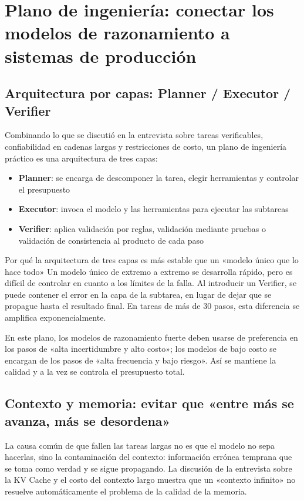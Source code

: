 \section{Plano de ingeniería: conectar los modelos de razonamiento a sistemas de producción}

\subsection{Arquitectura por capas: Planner / Executor / Verifier}

Combinando lo que se discutió en la entrevista sobre tareas verificables, confiabilidad en cadenas largas y restricciones de costo, un plano de ingeniería práctico es una arquitectura de tres capas:
\begin{itemize}
    \item \textbf{Planner}: se encarga de descomponer la tarea, elegir herramientas y controlar el presupuesto
    \item \textbf{Executor}: invoca el modelo y las herramientas para ejecutar las subtareas
    \item \textbf{Verifier}: aplica validación por reglas, validación mediante pruebas o validación de consistencia al producto de cada paso
\end{itemize}

\begin{knowledgebox}{Por qué la arquitectura de tres capas es más estable que un «modelo único que lo hace todo»}
Un modelo único de extremo a extremo se desarrolla rápido, pero es difícil de controlar en cuanto a los límites de la falla. Al introducir un Verifier, se puede contener el error en la capa de la subtarea, en lugar de dejar que se propague hasta el resultado final. En tareas de más de 30 pasos, esta diferencia se amplifica exponencialmente.
\end{knowledgebox}

En este plano, los modelos de razonamiento fuerte deben usarse de preferencia en los pasos de «alta incertidumbre y alto costo»; los modelos de bajo costo se encargan de los pasos de «alta frecuencia y bajo riesgo». Así se mantiene la calidad y a la vez se controla el presupuesto total.

\subsection{Contexto y memoria: evitar que «entre más se avanza, más se desordena»}

La causa común de que fallen las tareas largas no es que el modelo no sepa hacerlas, sino la contaminación del contexto: información errónea temprana que se toma como verdad y se sigue propagando. La discusión de la entrevista sobre la KV Cache y el costo del contexto largo muestra que un «contexto infinito» no resuelve automáticamente el problema de la calidad de la memoria.

